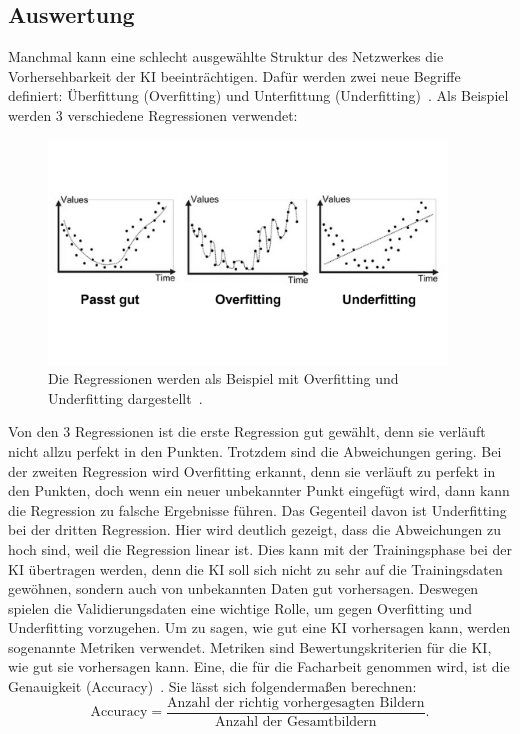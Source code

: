 \documentclass[11pt]{article}
\begin{document}
\subsection{Auswertung}\label{auswertung}
Manchmal kann eine schlecht ausgewählte Struktur des Netzwerkes die Vorhersehbarkeit der KI beeinträchtigen.
Dafür werden zwei neue Begriffe definiert: Überfittung (Overfitting) und Unterfittung (Underfitting)~\cite{7}.
Als Beispiel werden 3 verschiedene Regressionen verwendet:
\begin{figure}[h]
    \centering
    \includegraphics[width=300pt, keepaspectratio]{images/overfitting}
    \caption[Overfitting und Underfitting~\cite{7}]{Die Regressionen werden als Beispiel mit Overfitting und Underfitting dargestellt~\cite{7}.}
\end{figure}
Von den 3 Regressionen ist die erste Regression gut gewählt, denn sie verläuft nicht allzu perfekt in den Punkten. Trotzdem sind die
Abweichungen gering. Bei der zweiten Regression wird Overfitting erkannt, denn sie verläuft zu perfekt in den Punkten, doch wenn
ein neuer unbekannter Punkt eingefügt wird, dann kann die Regression zu falsche Ergebnisse führen. Das Gegenteil davon ist Underfitting
bei der dritten Regression. Hier wird deutlich gezeigt, dass die Abweichungen zu hoch sind, weil die Regression linear ist.
Dies kann mit der Trainingsphase bei der KI übertragen werden, denn die KI soll sich nicht zu sehr auf die Trainingsdaten gewöhnen,
sondern auch von unbekannten Daten gut vorhersagen. Deswegen spielen die Validierungsdaten eine wichtige Rolle, um gegen Overfitting
und Underfitting vorzugehen. Um zu sagen, wie gut eine KI vorhersagen kann, werden sogenannte Metriken verwendet. Metriken sind Bewertungskriterien für die KI,
wie gut sie vorhersagen kann. Eine, die für die Facharbeit genommen wird, ist die Genauigkeit (Accuracy)~\cite{21}. Sie lässt sich folgendermaßen
berechnen:
\begin{equation}
    \text{Accuracy} = \frac{\text{Anzahl der richtig vorhergesagten Bildern}}{\text{Anzahl der Gesamtbildern}}.
\end{equation}
\end{document}
